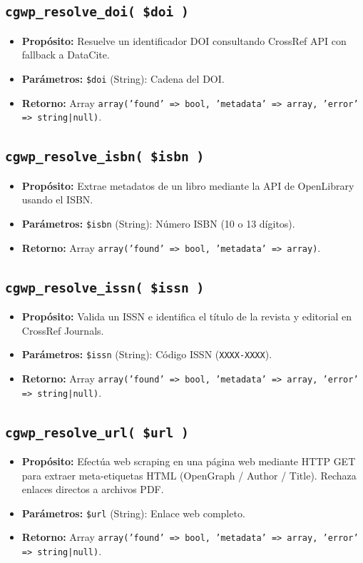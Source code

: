 \documentclass[11pt, a4paper]{article}
\begin{document}
\subsection{\texttt{cgwp\_resolve\_doi( \$doi )}}
\begin{itemize}
\item \textbf{Propósito:} Resuelve un identificador DOI consultando CrossRef API con fallback a DataCite.
\item \textbf{Parámetros:} \texttt{\$doi} (String): Cadena del DOI.
\item \textbf{Retorno:} Array \texttt{array('found' => bool, 'metadata' => array, 'error' => string|null)}.
\end{itemize}
\subsection{\texttt{cgwp\_resolve\_isbn( \$isbn )}}
\begin{itemize}
\item \textbf{Propósito:} Extrae metadatos de un libro mediante la API de OpenLibrary usando el ISBN.
\item \textbf{Parámetros:} \texttt{\$isbn} (String): Número ISBN (10 o 13 dígitos).
\item \textbf{Retorno:} Array \texttt{array('found' => bool, 'metadata' => array)}.
\end{itemize}
\subsection{\texttt{cgwp\_resolve\_issn( \$issn )}}
\begin{itemize}
\item \textbf{Propósito:} Valida un ISSN e identifica el título de la revista y editorial en CrossRef Journals.
\item \textbf{Parámetros:} \texttt{\$issn} (String): Código ISSN (\texttt{XXXX-XXXX}).
\item \textbf{Retorno:} Array \texttt{array('found' => bool, 'metadata' => array, 'error' => string|null)}.
\end{itemize}
\subsection{\texttt{cgwp\_resolve\_url( \$url )}}
\begin{itemize}
\item \textbf{Propósito:} Efectúa web scraping en una página web mediante HTTP GET para extraer meta-etiquetas HTML (OpenGraph / Author / Title). Rechaza enlaces directos a archivos PDF.
\item \textbf{Parámetros:} \texttt{\$url} (String): Enlace web completo.
\item \textbf{Retorno:} Array \texttt{array('found' => bool, 'metadata' => array, 'error' => string|null)}.
\end{itemize}
\end{document}
